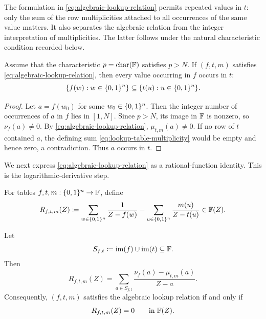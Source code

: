 The formulation in \eqref{eq:algebraic-lookup-relation} permits repeated values in $t$: only the sum of the row multiplicities attached to all occurrences of the same value matters.  It also separates the algebraic relation from the integer interpretation of multiplicities.  The latter follows under the natural characteristic condition recorded below.

\begin{proposition}
\label{prop:ordinary-lookup-consequence}
Assume that the characteristic $p=\operatorname{char}(\mathbb{F})$ satisfies $p>N$.  If $(f,t,m)$ satisfies \eqref{eq:algebraic-lookup-relation}, then every value occurring in $f$ occurs in $t$:
\begin{equation}
  \{f(w):w\in\{0,1\}^n\}
  \subseteq
  \{t(u):u\in\{0,1\}^n\}.
  \label{eq:lookup-support-inclusion}
\end{equation}
\end{proposition}

\begin{proof}
Let $a=f(w_0)$ for some $w_0\in\{0,1\}^n$.  Then the integer number of occurrences of $a$ in $f$ lies in $[1,N]$.  Since $p>N$, its image in $\mathbb{F}$ is nonzero, so $\nu_f(a)\ne0$.  By \eqref{eq:algebraic-lookup-relation}, $\mu_{t,m}(a)\ne0$.  If no row of $t$ contained $a$, the defining sum \eqref{eq:lookup-table-multiplicity} would be empty and hence zero, a contradiction.  Thus $a$ occurs in $t$.
\end{proof}

We next express \eqref{eq:algebraic-lookup-relation} as a rational-function identity.  This is the logarithmic-derivative step.

\begin{definition}
\label{def:lookup-rational-function}
For tables $f,t,m:\{0,1\}^n\to\mathbb{F}$, define
\begin{equation}
  R_{f,t,m}(Z)
  \coloneqq
  \sum_{w\in\{0,1\}^n}\frac{1}{Z-f(w)}
  -
  \sum_{u\in\{0,1\}^n}\frac{m(u)}{Z-t(u)}
  \in \mathbb{F}(Z).
  \label{eq:lookup-rational-function}
\end{equation}
\end{definition}

\begin{lemma}
\label{lem:lookup-residue-form}
Let
\begin{equation}
  S_{f,t}
  \coloneqq
  \operatorname{im}(f)\cup\operatorname{im}(t)
  \subseteq\mathbb{F}.
  \label{eq:lookup-value-set}
\end{equation}
Then
\begin{equation}
  R_{f,t,m}(Z)
  =
  \sum_{a\in S_{f,t}}
  \frac{\nu_f(a)-\mu_{t,m}(a)}{Z-a}.
  \label{eq:lookup-residue-expansion}
\end{equation}
Consequently, $(f,t,m)$ satisfies the algebraic lookup relation if and only if
\begin{equation}
  R_{f,t,m}(Z)=0
  \qquad\text{in }\mathbb{F}(Z).
  \label{eq:lookup-rational-zero}
\end{equation}
\end{lemma}

